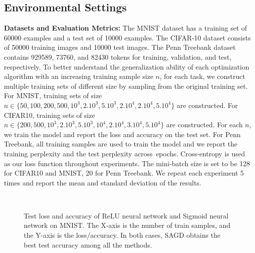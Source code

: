 \documentclass[11pt]{article}
\begin{document}
\subsection{Environmental Settings}
\vspace{-0.05in}


\textbf{Datasets and Evaluation Metrics:}  The MNIST dataset has a training set of 60000 examples and a test set of 10000 examples. The CIFAR-10 dataset consists of 50000 
training images and 10000 test images. The Penn Treebank dataset contains 929589, 73760, and 82430 tokens for training, validation, and test,  respectively.
To better understand the generalization ability of each optimization algorithm with an increasing training sample size $n$, for each task, we construct multiple training sets of different size by sampling from the original training set. For MNIST, training sets of size $n \in \{50, 100, 200, 500, 10^3, 2.10^3, 5.10^3, 2.10^4, 2.10^4, 5.10^4 \}$ are constructed. For CIFAR10, training sets of size $n \in \{ 200, 500, 10^3, 2.10^3, 5.10^3, 10^4, 2.10^4,3.10^4, 5.10^4\}$ are constructed. 
For each $n$, we train the model and report the loss and accuracy on the test set.  
For Penn Treebank, all training samples are used to train the model and we report the training perplexity and the test perplexity across~epochs. 
Cross-entropy is used as our loss function throughout experiments. The mini-batch size is set to be 128 for CIFAR10 and MNIST, 20 for Penn Treebank. 
We repeat each experiment 5 times and report the mean and standard deviation of the results.
\begin{figure}[t]
\mbox{
\hspace{-0.2in}
 }
 \caption[]{Test loss and accuracy of ReLU neural network and Sigmoid neural network on MNIST. The X-axis is the number of train samples, and the Y-axis is the loss/accuracy. In both cases, \textsc{SAGD} obtains the best test accuracy among all the methods.} 
 \label{fig:mnist}
\end{figure}
\end{document}
